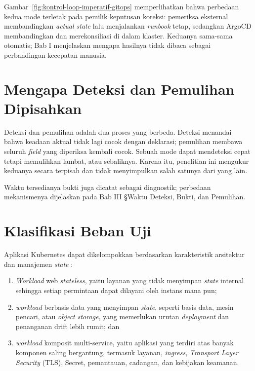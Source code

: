 

Gambar~\ref{fig:kontrol-loop-imperatif-gitops} memperlihatkan bahwa perbedaan kedua mode terletak pada pemilik keputusan koreksi: pemeriksa eksternal membandingkan \textit{actual state} lalu menjalankan \textit{runbook} tetap, sedangkan ArgoCD membandingkan dan merekonsiliasi di dalam klaster. Keduanya sama-sama otomatis; Bab I menjelaskan mengapa hasilnya tidak dibaca sebagai perbandingan kecepatan manusia.

\section{Mengapa Deteksi dan Pemulihan Dipisahkan}

Deteksi dan pemulihan adalah dua proses yang berbeda. Deteksi menandai bahwa keadaan aktual tidak lagi cocok dengan deklarasi; pemulihan membawa seluruh \textit{field} yang diperiksa kembali cocok. Sebuah mode dapat mendeteksi cepat tetapi memulihkan lambat, atau sebaliknya. Karena itu, penelitian ini mengukur keduanya secara terpisah dan tidak menyimpulkan salah satunya dari yang lain.

Waktu tersedianya bukti juga dicatat sebagai diagnostik; perbedaan mekanismenya dijelaskan pada Bab III §Waktu Deteksi, Bukti, dan Pemulihan.

\section{Klasifikasi Beban Uji}

Aplikasi Kubernetes dapat dikelompokkan berdasarkan karakteristik arsitektur dan manajemen \textit{state} \citep{siddiqui2023microservices, aghili2024workload}:
\begin{enumerate}
  \item \textit{Workload} web \textit{stateless}, yaitu layanan yang tidak menyimpan \textit{state} internal sehingga setiap permintaan dapat dilayani oleh instans mana pun;
  \item \textit{workload} berbasis data yang menyimpan \textit{state}, seperti basis data, mesin pencari, atau \textit{object storage}, yang memerlukan urutan \textit{deployment} dan penanganan drift lebih rumit; dan
  \item \textit{workload} komposit multi-service, yaitu aplikasi yang terdiri atas banyak komponen saling bergantung, termasuk layanan, \textit{ingress}, \textit{Transport Layer Security} (TLS), Secret, pemantauan, cadangan, dan kebijakan keamanan.
\end{enumerate}

